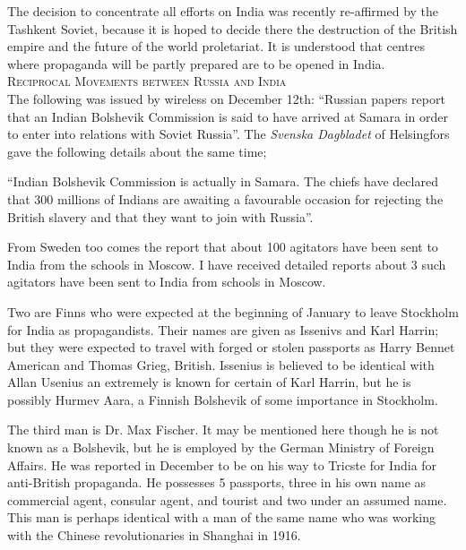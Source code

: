 The decision to concentrate all efforts on India was recently re-affirmed by the Tashkent Soviet, because it is hoped to decide there the destruction of the British empire and the future of the world proletariat. It is understood that centres where propaganda will be partly prepared are to be opened in India.\\ 


\textsc{Reciprocal Movements between Russia and India}\\

The following was issued by wireless on December 12th: 
“Russian papers report that an Indian Bolshevik Commission is said to have arrived at Samara in order to enter into relations with Soviet Russia”. 
The \textit{Svenska Dagbladet} of Helsingfors gave the following details about the same time; 

“Indian Bolshevik Commission is actually in Samara. The chiefs have declared that 300 millions of Indians are awaiting a favourable occasion for rejecting the British slavery and that they want to join with Russia”. 

From Sweden too comes the report that about 100 agitators have been sent to India from the schools in Moscow. I have received detailed reports about 3 such agitators have been sent to India from schools in Moscow. 

Two are Finns who were expected at the beginning of January to leave Stockholm for India as propagandists. Their names are given as Issenivs and Karl Harrin; but they were expected to travel with forged or stolen passports as Harry Bennet American and Thomas Grieg, British. Issenius is believed to be identical with Allan Usenius an extremely is known for certain of Karl Harrin, but he is possibly Hurmev Aara, a Finnish Bolshevik of some importance in Stockholm.

The third man is Dr. Max Fischer. It may be mentioned here though he is not known as a Bolshevik, but he is employed by the German Ministry of Foreign Affairs. He was reported in December to be on his way to Tricste for India for anti-British propaganda. He possesses 5 passports, three in his own name as commercial agent, consular agent, and tourist and two under an assumed name. This man is perhaps identical with a man of the same name who was working with the Chinese revolutionaries in Shanghai in 1916. 

